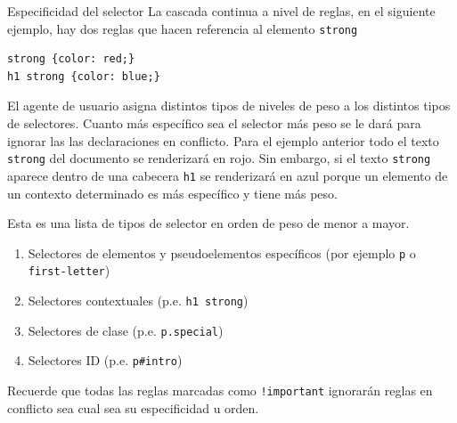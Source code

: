 \begin{frame}{Especificidad del selector} %
    La cascada continua a nivel de reglas, en el siguiente ejemplo, hay dos
    reglas que hacen referencia al elemento \texttt{strong} \\[0.5cm]
\begin{lstlisting}
strong {color: red;}
h1 strong {color: blue;}
\end{lstlisting}

    El agente de usuario asigna distintos tipos de niveles de peso a los
    distintos tipos de selectores. Cuanto más específico sea el selector más
    peso se le dará para ignorar las las declaraciones en conflicto. Para el
    ejemplo anterior todo el texto \texttt{strong} del documento se renderizará
    en rojo. Sin embargo, si el texto \texttt{strong} aparece dentro de una
    cabecera \texttt{h1} se renderizará en azul porque un elemento de un
    contexto determinado es más específico y tiene más peso. 

    Esta es una lista de tipos de selector en orden de peso de menor a mayor.

    \begin{enumerate}
        \item Selectores de elementos y pseudoelementos específicos (por
        ejemplo \texttt{p} o \texttt{first-letter}) 
        \item Selectores contextuales (p.e. \texttt{h1 strong})
        \item Selectores de clase (p.e. \texttt{p.special})
        \item Selectores ID (p.e. \texttt{p\#intro})
    \end{enumerate}

    Recuerde que todas las reglas marcadas como \texttt{!important} ignorarán
    reglas en conflicto sea cual sea su especificidad u orden. 
\end{frame}

